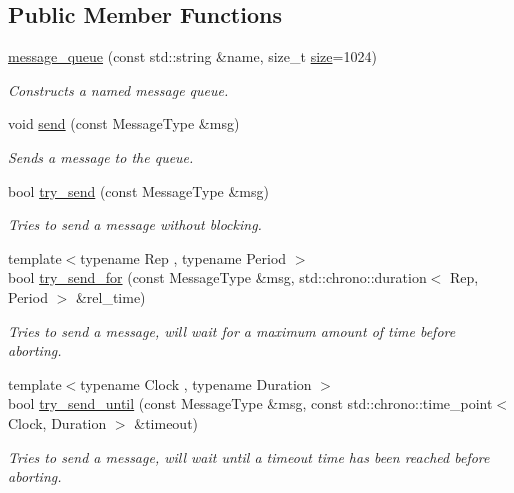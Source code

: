 \subsection*{Public Member Functions}
\begin{DoxyCompactItemize}
\item 
\hyperlink{classcpen333_1_1process_1_1message__queue_a3312decb9ec69e323ba97f321125d348}{message\+\_\+queue} (const std\+::string \&name, size\+\_\+t \hyperlink{classcpen333_1_1process_1_1message__queue_aab604a8c153f7f918762abc7f2380396}{size}=1024)
\begin{DoxyCompactList}\small\item\em Constructs a named message queue. \end{DoxyCompactList}\item 
void \hyperlink{classcpen333_1_1process_1_1message__queue_a1f50c208f75ad2937d11d7eca8fdb6f0}{send} (const Message\+Type \&msg)
\begin{DoxyCompactList}\small\item\em Sends a message to the queue. \end{DoxyCompactList}\item 
bool \hyperlink{classcpen333_1_1process_1_1message__queue_ae632a2b200bdac5bc93039b9bcb3d7f5}{try\+\_\+send} (const Message\+Type \&msg)
\begin{DoxyCompactList}\small\item\em Tries to send a message without blocking. \end{DoxyCompactList}\item 
{\footnotesize template$<$typename Rep , typename Period $>$ }\\bool \hyperlink{classcpen333_1_1process_1_1message__queue_a5242a6193a42e68e36634846f09c5e3b}{try\+\_\+send\+\_\+for} (const Message\+Type \&msg, std\+::chrono\+::duration$<$ Rep, Period $>$ \&rel\+\_\+time)
\begin{DoxyCompactList}\small\item\em Tries to send a message, will wait for a maximum amount of time before aborting. \end{DoxyCompactList}\item 
{\footnotesize template$<$typename Clock , typename Duration $>$ }\\bool \hyperlink{classcpen333_1_1process_1_1message__queue_ab13d8f1c89ca9022e5446b3fc5432072}{try\+\_\+send\+\_\+until} (const Message\+Type \&msg, const std\+::chrono\+::time\+\_\+point$<$ Clock, Duration $>$ \&timeout)
\begin{DoxyCompactList}\small\item\em Tries to send a message, will wait until a timeout time has been reached before aborting. \end{DoxyCompactList}\item 

\end{DoxyCompactItemize}
